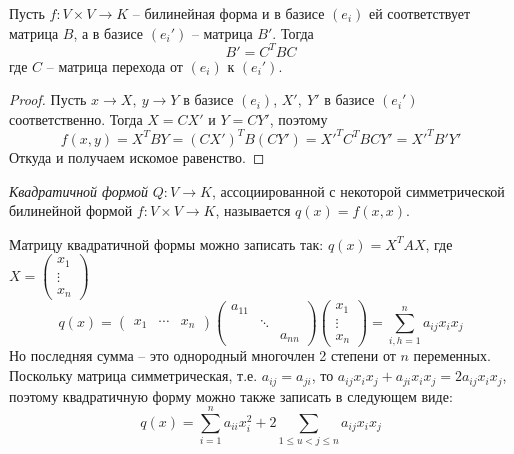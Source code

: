 
\begin{Thm} 
	Пусть $f: V \times V \to K$ -- билинейная форма и в базисе $(e_i)$ ей соответствует матрица $B$, а в базисе $(e_i')$ -- матрица  $B'$.
	Тогда
	\[B' = C^TBC\]
	где $C$ -- матрица перехода от $(e_i)$ к $(e_i')$.
\end{Thm}  

\begin{proof}
	Пусть $x \to X, \ y \to Y$ в базисе $(e_i)$, $X', \ Y'$ в базисе $(e_i')$ соответственно.
	Тогда $X = CX'$ и $Y = CY'$, поэтому
	\[f(x,y) = X^T B Y = (CX')^T B (CY') = X'^TC^TBCY' = X'^TB'Y'\]
	Откуда и получаем искомое равенство.
\end{proof}


\begin{Def}
	\textit{Квадратичной формой}  $Q: V \to K$, ассоциированной с некоторой симметрической билинейной формой $f: V \times V \to K$, называется $q(x)=f(x,x)$.
\end{Def} 

\begin{Def}
	Матрицу квадратичной формы можно записать так: $q(x) = X^TAX$, где $X = \left(
	\begin{array}{ccc}	
		x_1\\
		\vdots\\
		x_n
	\end{array}\right)$
	\[
	q(x) = \left(\begin{array}{ccc}
	x_1 & \cdots & x_n
	\end{array}\right) \left(
		\begin{array}{ccc}	
			a_{11} & & \\
			& \ddots & \\
			& &a_{nn}
		\end{array}\right)\left(
		\begin{array}{ccc}	
			x_1\\
			\vdots\\
			x_n
		\end{array}\right) = \sum_{i,h = 1}^{n} a_{ij}x_ix_j\]
		Но последняя сумма -- это однородный многочлен 2 степени от $n$ переменных.
		Поскольку матрица симметрическая, т.е. $a_{ij} = a_{ji}$, то $a_{ij}x_ix_j+a_{ji}x_ix_j = 2a_{ij}x_ix_j$, поэтому квадратичную форму 
		можно также записать в следующем виде:
		\[q(x) = \sum_{i=1}^{n} a_{ii} x_i^2 + 2 \sum_{1 \leqslant u < j \leqslant n} a_{ij} x_ix_j\]
\end{Def}

